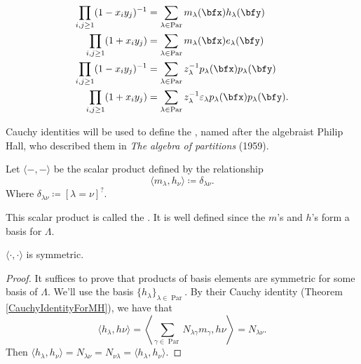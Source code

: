 \documentclass{article}
\DeclareMathOperator{\Par}{Par}
\begin{document}
\begin{theorem}
    \begin{align}
        \prod_{i,j \geq 1}
        (1-x_iy_j)^{-1}
        &=
        \sum_{\lambda\in\Par}
        m_\lambda(\bfx)h_\lambda(\bfy)
        \\
        \prod_{i,j \geq 1}
        (1+x_iy_j)
        &=
        \sum_{\lambda\in\Par}
        m_\lambda(\bfx)e_\lambda(\bfy)
        \\
        \prod_{i,j \geq 1}
        (1-x_iy_j)^{-1}
        &=
        \sum_{\lambda\in\Par}
        z_\lambda^{-1}p_\lambda(\bfx)p_\lambda(\bfy)
        \\
        \prod_{i,j \geq 1}
        (1+x_iy_j)
        &=
        \sum_{\lambda\in\Par}
        z_\lambda^{-1}\varepsilon_{\lambda} p_\lambda(\bfx) p_\lambda(\bfy).
    \end{align}
\end{theorem}

Cauchy identities will be used to define the , named after the algebraist Philip Hall, who described them in \textit{The algebra of partitions} (1959).

\begin{definition} Let $\langle -,- \rangle$ be the scalar product defined by the relationship
    \[
        \langle m_\lambda, h_\nu \rangle 
        \coloneq 
        \delta_{\lambda\nu}.
    \]
    Where $\delta_{\lambda\nu} \coloneq [\lambda = \nu]^?$.

    This scalar product is called the .
    It is well defined since the $m$'s and $h$'s form a basis for $\Lambda$.
\end{definition}

\begin{theorem}
    $\langle\cdot,\cdot\rangle$ is symmetric.
\end{theorem}

\begin{proof}
    It suffices to prove that products of basis elements are symmetric for some basis of $\Lambda$.
    We'll use the basis $\{h_\lambda\}_{\lambda\in\Par}$.
    By their Cauchy identity (Theorem \ref{CauchyIdentityForMH}), we have that
    \[
        \langle h_\lambda, h\nu \rangle = \left\langle \sum_{\gamma\in\Par} N_{\lambda\gamma} m_\gamma, h\nu \right\rangle = N_{\lambda\nu}.
    \]
    Then $\langle h_\lambda, h_\nu \rangle = N_{\lambda\nu} = N_{\nu\lambda} = \langle h_\lambda, h_\nu \rangle$.
\end{proof}
\end{document}
